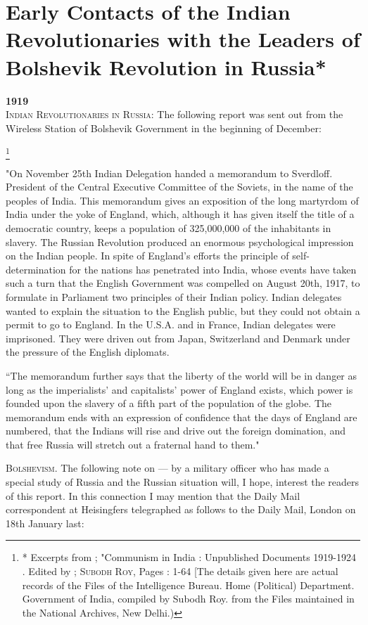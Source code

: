 \section{Early Contacts of the Indian Revolutionaries with the Leaders of Bolshevik Revolution in Russia*}
\textbf{1919}\\

\textsc{Indian Revolutionaries in Russia:} The following report was sent out from the Wireless Station of Bolshevik Government in the beginning of December: 

\footnote{* Excerpts from ; "Communism in India : Unpublished Documents 1919-1924 . Edited by ; \textsc{Subodh Roy}, Pages : 1-64 [The details given here are actual 
records of the Files of the Intelligence Bureau. Home (Political) Department. 
Government of India, compiled by Subodh Roy. from the Files maintained in the 
National Archives, New Delhi.) }

"On November 25th Indian Delegation handed a memorandum to Sverdloff. President of the Central Executive Committee of the Soviets, in the name of the peoples of India. This memorandum gives an exposition of the long martyrdom of India under the yoke of England, which, although it has given itself the title of a democratic country, keeps a population of 325,000,000 of the inhabitants in slavery. The Russian Revolution produced an enormous psychological impression on the Indian people. In spite of England's efforts the principle of self-determination for the nations has penetrated into India, whose events have taken such a turn that the English Government was compelled on August 20th, 1917, to formulate in Parliament two principles of their Indian policy. Indian delegates wanted to explain the situation to the English public, but they could not obtain a permit to go to England. In the U.S.A. and in France, Indian delegates were imprisoned. They were driven out from Japan, Switzerland and Denmark under the pressure of the English diplomats. 

“The memorandum further says that the liberty of the world will be in danger as long as the imperialists' and capitalists’ power of England exists, which power is founded upon the slavery of a fifth part of the population of the globe. The memorandum ends with an expression of confidence that the days of England are numbered, that the Indians will rise and drive out the foreign domination, and that free Russia will stretch out a fraternal hand to them." 

\textsc{Bolshevism}. The following note on — by a military officer who has made a special study of Russia and the Russian situation will, I hope, interest the readers of this report. In this connection I may mention that the Daily Mail correspondent at Heisingfers telegraphed as follows to the Daily Mail, London on 18th January last: 

